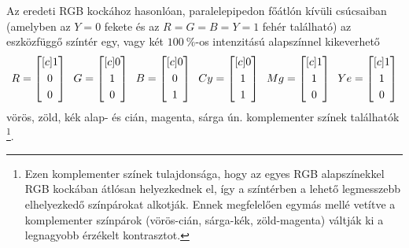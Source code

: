 Az eredeti RGB kockához hasonlóan, paralelepipedon főátlón kívüli csúcsaiban (amelyben az $Y=0$ fekete és az $R=G=B=Y=1$ fehér található) az eszközfüggő színtér egy, vagy két $100~\%$-os intenzitású alapszínnel kikeverhető
\begin{equation}
R = \begin{bmatrix}[c] 1\\[0.3em] 0\\[0.3em] 0\end{bmatrix} \hspace{2mm}
G = \begin{bmatrix}[c] 0\\[0.3em] 1\\[0.3em] 0\end{bmatrix}\hspace{2mm}
B = \begin{bmatrix}[c] 0\\[0.3em] 0\\[0.3em] 1\end{bmatrix}\hspace{2mm}
Cy = \begin{bmatrix}[c] 0\\[0.3em] 1\\[0.3em] 1\end{bmatrix}\hspace{2mm}
Mg = \begin{bmatrix}[c] 1\\[0.3em] 1\\[0.3em] 0\end{bmatrix}\hspace{2mm}
Ye = \begin{bmatrix}[c] 1\\[0.3em] 1\\[0.3em] 0\end{bmatrix}
\end{equation}
vörös, zöld, kék alap- és cián, magenta, sárga ún. komplementer színek találhatók \footnote{Ezen komplementer színek tulajdonsága, hogy az egyes RGB alapszínekkel RGB kockában átlósan helyezkednek el, így a színtérben a lehető legmesszebb elhelyezkedő színpárokat alkotják.
Ennek megfelelően egymás mellé vetítve a komplementer színpárok (vörös-cián, sárga-kék, zöld-magenta) váltják ki a legnagyobb érzékelt kontrasztot.}.


